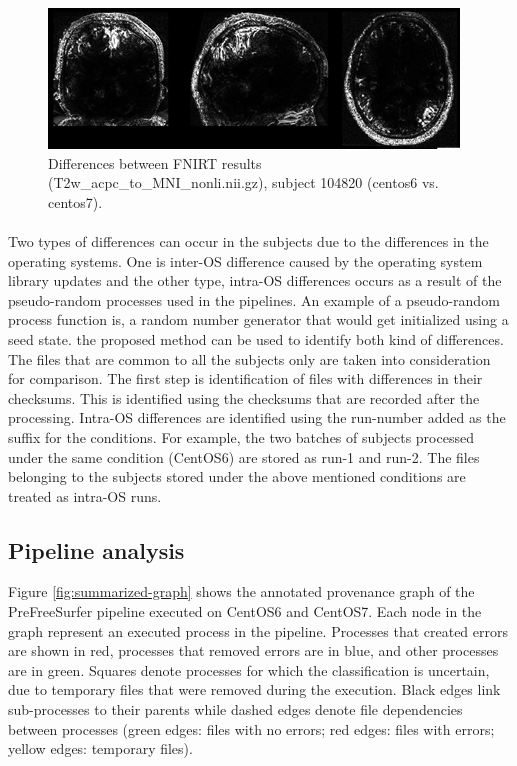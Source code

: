 \documentclass{article}
\begin{document}
\begin{figure}[H]
\centering
  \includegraphics[scale=0.8]{images/fnirt_result.png}
  \caption{Differences between FNIRT results (T2w\_acpc\_to\_MNI\_nonli.nii.gz), subject 104820 (centos6 vs. centos7).}
  \label{fig:fnirt_result}
\end{figure}

\paragraph{}
Two types of differences can occur in the subjects due to the differences in the operating systems. 
One is inter-OS difference caused by the operating system library updates and the other type,
 intra-OS differences occurs as a result of the pseudo-random processes used in the pipelines.
 An example of a pseudo-random process function is, a random number generator that would get initialized 
using a seed state. the proposed method can be used to identify both kind of differences. 
The files that are common to all the subjects only are taken into consideration for comparison. The first step
 is identification of files with differences in their checksums. This is identified using the checksums that are
 recorded after the processing. Intra-OS differences are identified using the run-number added as the suffix for
 the conditions. For example, the two batches of subjects processed under the same condition (CentOS6) are stored 
as run-1 and run-2. The files belonging to the subjects stored under the above mentioned conditions are treated as intra-OS runs.



\subsection{Pipeline analysis}

Figure \ref{fig:summarized-graph} shows the annotated provenance graph of the
PreFreeSurfer pipeline executed on CentOS6 and CentOS7.
Each node in the graph represent an executed process in the pipeline.
Processes that created errors are shown in red, processes that removed errors
are in blue, and other processes are in green.  Squares denote
processes for which the classification is uncertain, due to temporary
files that were removed during the execution. Black edges link
sub-processes to their parents while dashed edges denote file
dependencies between processes (green edges: files with no errors; red
edges: files with errors; yellow edges: temporary files).
\end{document}
